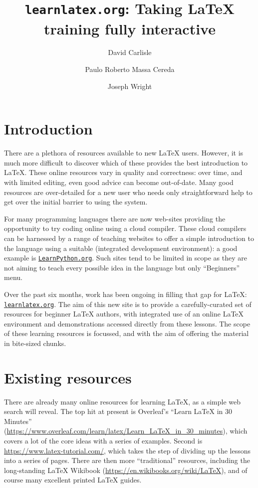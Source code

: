 \documentclass[harvardcite]{ltugboat}
\title{\texttt{learnlatex.org}: Taking \LaTeX{} training fully interactive}
\author{David Carlisle}
\author{Paulo Roberto Massa Cereda}
\author{Joseph Wright}
\begin{document}
\maketitle

\section{Introduction}

There are a plethora of resources available to new \LaTeX{} users. However, it
is much more difficult to discover which of these provides the best
introduction to \LaTeX{}. These online resources vary in quality and correctness:
over time, and with limited editing, even good advice can become out-of-date.
Many good resources are over-detailed for a new user who needs only
straightforward help to get over the initial barrier to using the system.

For many programming languages there are now web-sites providing the
opportunity to try coding online using a cloud compiler. These cloud compilers
can be harnessed by a range of teaching websites to offer a simple introduction
to the language using a suitable  (integrated development
environment): a good example is \href{https://LearnPython.org}{\nolinkurl{LearnPython.org}}. Such sites tend to be
limited in scope as they are not aiming to teach every possible idea in the
language but only \enquote{Beginners} menu.

Over the past six months, work has been ongoing in filling that gap for
\LaTeX{}: \href{https://learnlatex.org}{\nolinkurl{learnlatex.org}}. The aim of this new site is to provide a
carefully-curated set of resources for beginner \LaTeX{} authors, with integrated
use of an online \LaTeX{} environment and demonstrations accessed directly from
these lessons. The scope of these learning resources is focussed, and with the
aim of offering the material in bite-sized chunks.

\section{Existing resources}

There are already many online resources for learning \LaTeX{}, as a simple web
search will reveal. The top hit at present is Overleaf's \enquote{Learn
\LaTeX{} in 30 Minutes}
(\url{https://www.overleaf.com/learn/latex/Learn_LaTeX_in_30_minutes}), which
covers a lot of the core ideas with a series of examples. Second is
\url{https://www.latex-tutorial.com/}, which takes the step of dividing up the
lessons into a series of pages. There are then more \enquote{traditional}
resources, including the long-standing \LaTeX{} Wikibook
(\url{https://en.wikibooks.org/wiki/LaTeX}), and of course many excellent
printed \LaTeX{} guides.
\end{document}
